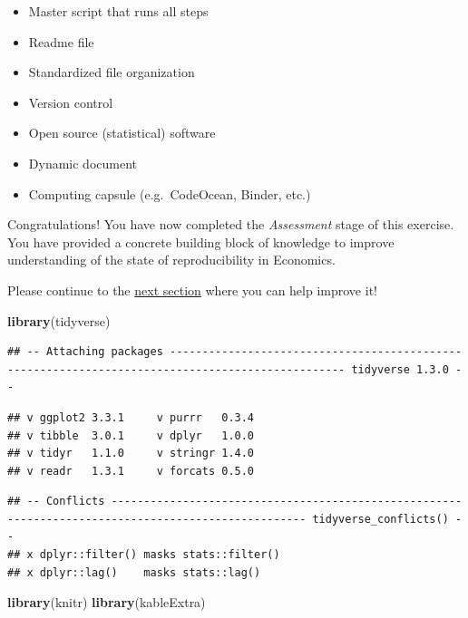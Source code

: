 \documentclass[]{book}
\newenvironment{Shaded}{\begin{snugshade}}{\end{snugshade}}
\newcommand{\KeywordTok}[1]{\textcolor[rgb]{0.13,0.29,0.53}{\textbf{#1}}}
\newcommand{\NormalTok}[1]{#1}
\providecommand{\tightlist}{%
  \setlength{\itemsep}{0pt}\setlength{\parskip}{0pt}}
\begin{document}
\begin{itemize}
\tightlist
\item
  Master script that runs all steps
\item
  Readme file
\item
  Standardized file organization\\
\item
  Version control
\item
  Open source (statistical) software\\
\item
  Dynamic document\\
\item
  Computing capsule (e.g.~CodeOcean, Binder, etc.)
\end{itemize}

Congratulations! You have now completed the \emph{Assessment} stage of this exercise. You have provided a concrete building block of knowledge to improve understanding of the state of reproducibility in Economics.

Please continue to the \protect\hyperlink{improvements}{next section} where you can help improve it!

\begin{Shaded}
\begin{Highlighting}[]
\KeywordTok{library}\NormalTok{(tidyverse)}
\end{Highlighting}
\end{Shaded}

\begin{verbatim}
## -- Attaching packages ------------------------------------------------------------------------------------------------- tidyverse 1.3.0 --
\end{verbatim}

\begin{verbatim}
## v ggplot2 3.3.1     v purrr   0.3.4
## v tibble  3.0.1     v dplyr   1.0.0
## v tidyr   1.1.0     v stringr 1.4.0
## v readr   1.3.1     v forcats 0.5.0
\end{verbatim}

\begin{verbatim}
## -- Conflicts ---------------------------------------------------------------------------------------------------- tidyverse_conflicts() --
## x dplyr::filter() masks stats::filter()
## x dplyr::lag()    masks stats::lag()
\end{verbatim}

\begin{Shaded}
\begin{Highlighting}[]
\KeywordTok{library}\NormalTok{(knitr)}
\KeywordTok{library}\NormalTok{(kableExtra)}
\end{Highlighting}
\end{Shaded}
\end{document}
